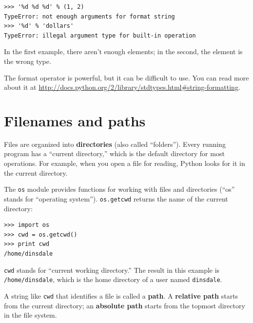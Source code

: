 \documentclass[10pt]{book}
\begin{document}
\begin{verbatim}
>>> '%d %d %d' % (1, 2)
TypeError: not enough arguments for format string
>>> '%d' % 'dollars'
TypeError: illegal argument type for built-in operation
\end{verbatim}
%
In the first example, there aren't enough elements; in the
second, the element is the wrong type.

The format operator is powerful, but it can be difficult to use.  You
can read more about it at
\url{http://docs.python.org/2/library/stdtypes.html#string-formatting}.




\section{Filenames and paths}
\label{paths}

Files are organized into {\bf directories} (also called ``folders'').
Every running program has a ``current directory,'' which is the
default directory for most operations.
For example, when you open a file for reading, Python looks for it in the
current directory.

The {\tt os} module provides functions for working with files and
directories (``os'' stands for ``operating system'').  {\tt os.getcwd}
returns the name of the current directory:

\begin{verbatim}
>>> import os
>>> cwd = os.getcwd()
>>> print cwd
/home/dinsdale
\end{verbatim}
%
{\tt cwd} stands for ``current working directory.''  The result in
this example is {\tt /home/dinsdale}, which is the home directory of a
user named {\tt dinsdale}.

A string like {\tt cwd} that identifies a file is called a {\bf path}.
A {\bf relative path} starts from the current directory;
an {\bf absolute path} starts from the topmost directory in the
file system.
\end{document}
